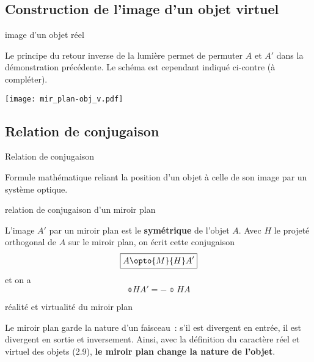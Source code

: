 \documentclass[../main/main.tex]{subfiles}
\begin{document}
\newpage

\subsection{Construction de l'image d'un objet virtuel}

\begin{exem}[label=exem:mir, sidebyside,
    righthand width=.2\linewidth]{image d'un objet réel}

    Le principe du retour inverse de la lumière permet de permuter $A$ et $A'$
    dans la démonstration précédente. Le schéma est cependant indiqué ci-contre
    (à compléter).

    \tcblower
    \begin{center}
        \texttt{[image: mir\_plan-obj\_v.pdf]}
        \label{fig:mir_plan-obj_v}
    \end{center}
\end{exem}

\subsection{Relation de conjugaison}

\begin{tcbraster}[raster columns=8, raster equal height=rows]
    
    \begin{defi}[label=def:relconj, raster multicolumn=2, heart]{Relation de
        conjugaison}

        Formule mathématique reliant la position d'un objet à celle de son image
        par un système optique.

    \end{defi}
    \begin{prop}[label=prop:mirconj, raster multicolumn=3]{relation de
        conjugaison d'un miroir plan}

        L'image $A'$ par un miroir plan est le \textbf{symétrique} de l'objet
        $A$. Avec $H$ le projeté orthogonal de $A$ sur le miroir plan, on écrit
        cette conjugaison
        \[ \boxed{A \opto{M}{H} A'}\]
        et on a
        \[\boxed{\obar{HA'} = -\obar{HA}}\]

    \end{prop}
    \begin{rema}[label=rema:mirrv, raster multicolumn=3]{réalité et virtualité
        du miroir plan}

        Le miroir plan garde la nature d'un faisceau~: s'il est divergent en
        entrée, il est divergent en sortie et inversement. Ainsi, avec la
        définition du caractère réel et virtuel des objets (2.9), \textbf{le
        miroir plan change la nature de l'objet}.

    \end{rema}
\end{tcbraster}
\end{document}
